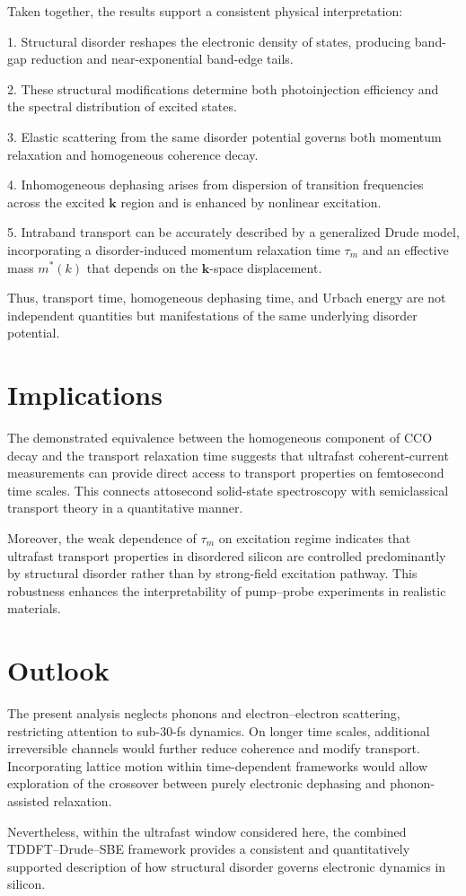 Taken together, the results support a consistent physical interpretation:

1. Structural disorder reshapes the electronic density of states, producing band-gap reduction and near-exponential band-edge tails.

2. These structural modifications determine both photoinjection efficiency and the spectral distribution of excited states.

3. Elastic scattering from the same disorder potential governs both momentum relaxation and homogeneous coherence decay.

4. Inhomogeneous dephasing arises from dispersion of transition frequencies across the excited $\mathbf{k}$ region and is enhanced by nonlinear excitation.

5. Intraband transport can be accurately described by a generalized Drude model, incorporating a disorder-induced momentum relaxation time $\tau_m$ and an effective mass $m^*(k)$ that depends on the $\mathbf{k}$-space displacement.

Thus, transport time, homogeneous dephasing time, and Urbach energy are not independent quantities but manifestations of the same underlying disorder potential.

\section*{Implications}

The demonstrated equivalence between the homogeneous component of CCO decay and the transport relaxation time suggests that ultrafast coherent-current measurements can provide direct access to transport properties on femtosecond time scales. This connects attosecond solid-state spectroscopy \cite{Schultze2014Si,Lucchini2016Science} with semiclassical transport theory in a quantitative manner.

Moreover, the weak dependence of $\tau_m$ on excitation regime indicates that ultrafast transport properties in disordered silicon are controlled predominantly by structural disorder rather than by strong-field excitation pathway. This robustness enhances the interpretability of pump–probe experiments in realistic materials.

\section*{Outlook}

The present analysis neglects phonons and electron–electron scattering, restricting attention to sub-30-fs dynamics. On longer time scales, additional irreversible channels would further reduce coherence and modify transport. Incorporating lattice motion within time-dependent frameworks would allow exploration of the crossover between purely electronic dephasing and phonon-assisted relaxation.

Nevertheless, within the ultrafast window considered here, the combined TDDFT–Drude–SBE framework provides a consistent and quantitatively supported description of how structural disorder governs electronic dynamics in silicon.